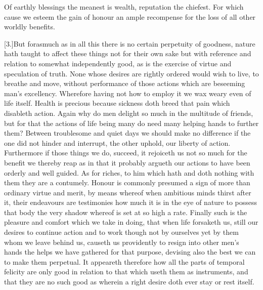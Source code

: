 Of earthly blessings the meanest is wealth, reputation the chiefest. For which cause we esteem the gain of honour an ample recompense for the loss of all other worldly benefits.

[3.]But forasmuch as in all this there is no certain perpetuity of goodness, nature hath taught to affect these things not for their own sake but with reference and relation to somewhat independently good, as is the exercise of virtue and  speculation of truth.
 None whose desires are rightly ordered would wish to live, to breathe and move, without performance of those actions which are beseeming man’s excellency. Wherefore having not how to employ it we wax weary even of life itself. Health is precious because sickness doth breed that pain which disableth action. Again why do men delight so much in the multitude of friends, but for that the actions of life being many do need many helping hands to further them? Between troublesome and quiet days we should make no difference if the one did not hinder and interrupt, the other uphold, our liberty of action. Furthermore if those things we do, succeed, it rejoiceth us not so much for the benefit we thereby reap as in that it probably argueth our actions to have been orderly and well guided. As for riches, to him which hath and doth nothing with them they are a contumely. Honour is commonly presumed a sign of more than ordinary virtue and merit, by means whereof when ambitious minds thirst after it, their endeavours are testimonies how much it is in the eye of nature to possess that body the very shadow whereof is set at so high a rate. Finally such is the pleasure and comfort which we take in doing, that when life forsaketh us, still our desires to continue action and to work though not by ourselves yet by them whom we leave behind us, causeth us providently to resign into other men’s hands the helps we have gathered for that purpose, devising also the best we can to make them perpetual. It appeareth therefore how all the parts of temporal felicity are only good in relation to that which useth them as instruments, and that they are no such good as wherein a right desire doth ever stay or rest itself.

